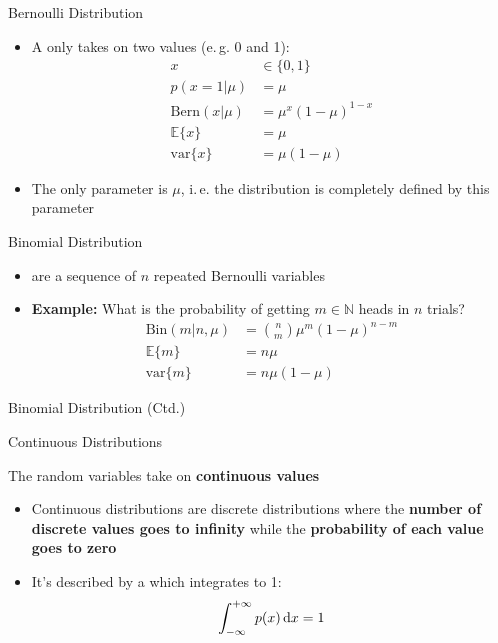 \begin{frame}{Bernoulli Distribution}{}
	\begin{itemize}
		\item A  only takes on two values (e.\,g. 0 and 1):
		\begin{align}
			x
				&\in \{ 0, 1 \} 				\\
			p(x = 1 \vert \mu)
				&= \mu 					\\
			\text{Bern}(x \vert \mu)
				&= \mu^x (1 - \mu)^{1 - x} 	\\
			\mathbb{E}\{ x \}
				&= \mu 					\\
			\text{var}\{ x \}
				&= \mu (1 - \mu)
		\end{align}
		\item The only parameter is $\mu$, i.\,e. the distribution is completely defined by this parameter
	\end{itemize}
\end{frame}


\begin{frame}{Binomial Distribution}{}
	\begin{itemize}
		\item {} are a sequence of $n$ repeated Bernoulli variables
		\item \textbf{Example:} What is the probability of getting $m \in \mathbb{N}$ heads in $n$ trials?
		\begin{align}
			\text{Bin}(m \vert n, \mu)
				&= \binom{n}{m} \mu^m (1 - \mu)^{n - m}		\\[2mm]
			\mathbb{E}\{ m \}
				&= n \mu 								\\[2mm]
			\text{var}\{ m \}
				&= n \mu (1 - \mu)
		\end{align}
	\end{itemize}
\end{frame}


\begin{frame}{Binomial Distribution (Ctd.)}{}
	
\end{frame}


\begin{frame}{Continuous Distributions}{}
	\begin{boxBlueNoFrame}
		The random variables take on \textbf{continuous values}
	\end{boxBlueNoFrame}

	\begin{itemize}
		\item Continuous distributions are discrete distributions where the \textbf{number of discrete values goes to infinity}
		while the \textbf{probability of each value goes to zero}
		\item It's described by a  which integrates to 1:
		\begin{equation*}
			\int_{-\infty}^{+\infty} p(x) \mathop{}\!\mathrm{d} x = 1
		\end{equation*}
	\end{itemize}
\end{frame}


